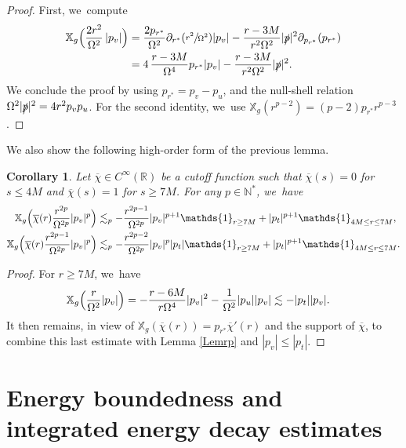 \documentclass[JEP,XML,SOM,Unicode,published]{cedram}
\theoremstyle{plain}
\newtheorem{corollary}[proposition]{Corollary}
\theoremstyle{definition}
\newcommand\R{{\mathbb{R}}}
\newcommand\T{{\mathbb{X}}}
\begin{document}
\begin{proof}
First, we~compute
\begin{align*}
\T_g \Bigl(\frac{2r^2}{\Omega^2}\, |p_v| \Bigr) & = \frac{2p_{r^*}}{\Omega^2} \partial_{r^*}(\sfrac{r^2}{\Omega^2}) |p_v| -\frac{r-3M}{r^2 \Omega^2} |\slashed{p}|^2 \partial_{p_{r^*}} (p_{r^*}) \\
&= 4\,\frac{r-3M}{\Omega^4}p_{r^*}|p_v| - \frac{r-3M}{r^2\Omega^2} |\slashed{p}|^2.
\end{align*}
We conclude the proof by using $p_{r^*}=p_v-p_u$, and the null-shell relation $\Omega^2 |\slashed{p}|^2=4r^2p_vp_u$. For the second identity, we~use $\T_g(r^{p-2})=(p-2)p_{r^*}r^{p-3}$.
\end{proof}

\pagebreak[2]
We also show the following high-order form of the previous lemma.

\begin{corollary}\label{Corrp}
Let $\overline{\chi} \in C^\infty (\R)$ be a cutoff function such that $\overline{\chi} (s) =0$ for $s \leq 4M$ and $\overline{\chi} (s) = 1$ for $s \geq 7M$. For any $p \in \mathbb{N}^*$, we~have\vspace*{-3pt}
\begin{align*}
\T_g \Bigl(\overline{\chi}(r) \frac{r^{2p}}{\Omega^{2p}} |p_v|^p \Bigr) & \lesssim_p -\frac{r^{2p-1}}{\Omega^{2p}}|p_v|^{p+1} \mathds{1}_{r \geq 7M}+|p_t|^{p+1} \mathds{1}_{4M \leq r \leq 7M}, \\
\T_g \Bigl(\overline{\chi}(r) \frac{r^{2p-1}}{\Omega^{2p}} |p_v|^p \Bigr) & \lesssim_p -\frac{r^{2p-2}}{\Omega^{2p}}|p_v|^{p}|p_t| \mathds{1}_{r \geq 7M}+|p_t|^{p+1} \mathds{1}_{4M \leq r \leq 7M}.
\end{align*}
\end{corollary}
\begin{proof}
For $r \geq 7M$, we~have\vspace*{-3pt}
\begin{align*}
\T_g \Bigl(\frac{r}{\Omega^2} |p_v| \Bigr) & = -\frac{r-6M}{r\Omega^4}|p_v|^2-\frac{1}{\Omega^2}|p_u ||p_v| \lesssim -|p_t||p_v|.
\end{align*}
It then remains, in view of $\T_g(\overline{\chi}(r))=p_{r^*} \overline{\chi}'(r)$ and the support of $\overline{\chi}$, to combine this last estimate with Lemma \ref{Lemrp} and $|p_v| \leq |p_t|$.
\end{proof}

\section{Energy boundedness and integrated energy decay estimates}\label{Sec4}
\end{document}
